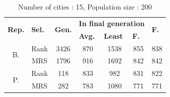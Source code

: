 \documentclass[10pt,a4paper,openbib]{article}
\begin{document}
\begin{multicols}{2}
\begin{table}[H]
\centering
\begin{tabular}{|c|c|c|c|c|c|c|}
\hline
\multicolumn{1}{|l|}{\multirow{2}{*}{\textbf{Rep.}}} & \multicolumn{1}{l|}{\multirow{2}{*}{\textbf{Sel.}}} & \multicolumn{1}{l|}{\multirow{2}{*}{\textbf{Gen.}}} & \multicolumn{3}{c|}{\textbf{In final generation}}                                                                & \multicolumn{1}{l|}{\multirow{2}{*}{\textbf{F.}}} \\ \cline{4-6}
\multicolumn{1}{|l|}{}                               & \multicolumn{1}{l|}{}                               & \multicolumn{1}{l|}{}                               & \multicolumn{1}{l|}{\textbf{Avg.}} & \multicolumn{1}{l|}{\textbf{Least}} & \multicolumn{1}{l|}{\textbf{F.}} & \multicolumn{1}{l|}{}                                  \\ \hline
\multirow{2}{*}{B.}                                  & Rank                                                & 3426                                                & 870                                & 1538                                & 855                                   & 838                                                    \\ \cline{2-7} 
                                                     & MRS                                                & 1796                                                & 916                                & 1692                                & 842                                   & 842                                                    \\ \hline
\multirow{2}{*}{P.}                                  & Rank                                                & 118                                                  & 833                                & 982                                & 831                                   & 822                                                    \\ \cline{2-7} 
                                                     & MRS                                                & 282                                                 & 783                                & 1080                                & 771                                   & 771                                                    \\ \hline
\end{tabular}
\caption{Number of cities : 15, Population size : 200}
\label{my-label}
\end{table}


\end{multicols}
\end{document}
